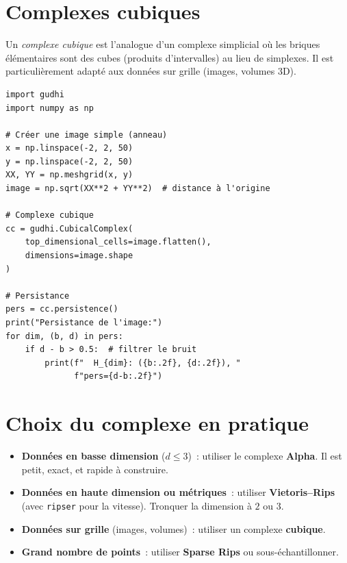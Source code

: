 \section{Complexes cubiques}

\begin{definition}
Un \emph{complexe cubique} est l'analogue d'un complexe simplicial
o\`u les briques \'el\'ementaires sont des cubes (produits d'intervalles)
au lieu de simplexes. Il est particuli\`erement adapt\'e aux donn\'ees
sur grille (images, volumes 3D).
\end{definition}

\begin{codeblock}[title=\textbf{Homologie persistante d'une image}]
\begin{verbatim}
import gudhi
import numpy as np

# Créer une image simple (anneau)
x = np.linspace(-2, 2, 50)
y = np.linspace(-2, 2, 50)
XX, YY = np.meshgrid(x, y)
image = np.sqrt(XX**2 + YY**2)  # distance à l'origine

# Complexe cubique
cc = gudhi.CubicalComplex(
    top_dimensional_cells=image.flatten(),
    dimensions=image.shape
)

# Persistance
pers = cc.persistence()
print("Persistance de l'image:")
for dim, (b, d) in pers:
    if d - b > 0.5:  # filtrer le bruit
        print(f"  H_{dim}: ({b:.2f}, {d:.2f}), "
              f"pers={d-b:.2f}")
\end{verbatim}
\end{codeblock}

\section{Choix du complexe en pratique}

\begin{algorithme}[title=\textbf{Guide de choix du complexe}]
\begin{itemize}
  \item \textbf{Donn\'ees en basse dimension} ($d \leq 3$)~:
        utiliser le complexe \textbf{Alpha}. Il est petit, exact, et
        rapide \`a construire.
  \item \textbf{Donn\'ees en haute dimension ou m\'etriques}~:
        utiliser \textbf{Vietoris--Rips} (avec \texttt{ripser} pour la
        vitesse). Tronquer la dimension \`a $2$ ou $3$.
  \item \textbf{Donn\'ees sur grille} (images, volumes)~: utiliser un
        complexe \textbf{cubique}.
  \item \textbf{Grand nombre de points}~: utiliser \textbf{Sparse Rips}
        ou sous-\'echantillonner.
\end{itemize}
\end{algorithme}

